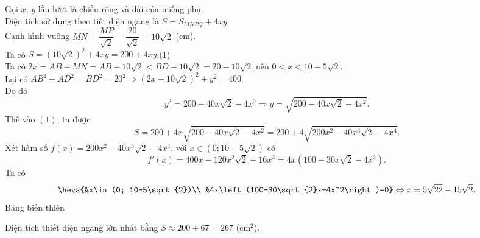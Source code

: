 \begin{ex}
{\begin{center}
\begin{tikzpicture}[scale=1.2, font=\footnotesize,line join=round, line cap=round, >=stealth]
		\end{tikzpicture}	
	\end{center}
	Gọi $x$, $y$ lần lượt là chiều rộng và dài của miếng phụ.\\
	Diện tích sử dụng theo tiết diện ngang là $S=S_{MNPQ}+4xy$.\\
	Cạnh hình vuông $M N=\dfrac{M P}{\sqrt{2}}=\dfrac{20}{\sqrt{2}}=10 \sqrt{2}$ (cm).\\
	Ta có $S=(10 \sqrt{2})^2+4xy=200+4 x y$.\qquad (1)\\
	Ta có $2 x=A B-M N=A B-10 \sqrt{2}<B D-10 \sqrt{2}=20-10 \sqrt{2}$ nên $0<x<10-5\sqrt{2}$.\\
	Lại có $A B^2+A D^2=B D^2=20^2 \Rightarrow(2 x+10 \sqrt{2})^2+y^2=400$.\\ Do đó
	$$
	y^2=200-40 x \sqrt{2}-4 x^2 \Rightarrow y=\sqrt{200-40 x \sqrt{2}-4 x^2}.
	$$
	Thế vào $(1)$, ta được 
	$$
	S=200+4 x \sqrt{200-40 x \sqrt{2}-4 x^2}=200+4 \sqrt{200 x^2-40 x^3 \sqrt{2}-4 x^4}.
	$$
	Xét hàm số $f(x)=200 x^2-40 x^3 \sqrt{2}-4 x^4$, với $x \in(0 ; 10-5\sqrt{2})$ có
	$$
	f'(x)=400 x-120 x^2 \sqrt{2}-16 x^3=4x\left(100-30x\sqrt{2}-4x^2\right).
	$$
	Ta có \[\heva{&x\in (0; 10-5\sqrt{2})\\ &4x\left(100-30\sqrt{2}x-4x^2\right)=0}\Leftrightarrow x=5 \sqrt{22}-15 \sqrt{2}.\]
	Bảng biến thiên
	\begin{center}
	\end{center}
	Diện tích thiết diện ngang lớn nhất bằng $S\approx 200+67=267$ (cm$^2$).
	}
\end{ex}

